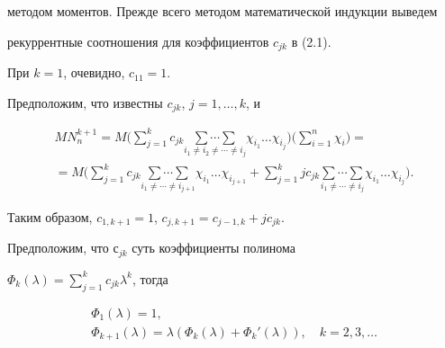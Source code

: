 методом моментов. Прежде всего методом математической индукции выведем


рекуррентные соотношения для коэффициентов $c_{jk}$ в (2.1).





При $k=1$, очевидно, $c_{11}=1$.


Предположим, что известны $c_{jk}$, $j=1,\dotsc ,k$, и


\begin{multline*}


MN_n^{k+1}=M\bigg(\sum_{j=1}^k c_{jk}


\underset{i_1\neq i_2\neq \dotsb \neq i_j}


{\sum\dotsb \sum}{} \chi_{i_1}\dotsc \chi_{i_j}\bigg)


\bigg(\sum_{i=1}^n\chi_i\bigg)= \\


%


=M\bigg(\sum_{j=1}^k c_{jk}


\underset{i_1\neq \dotsb \neq i_{j+1}}


{\sum\dotsb \sum}{}\chi_{i_1}\dotsc \chi_{i_{j+1}}+


\sum_{j=1}^k j c_{jk}


\underset{i_1\neq \dotsb \neq i_j}


{\sum\dotsb \sum}\chi_{i_1}\dotsc \chi_{i_j}\bigg).


\end{multline*}


Таким образом, $c_{1,k+1}=1$, $c_{j,k+1}=c_{j-1,k}+j c_{jk}$.





Предположим, что $с_{jk}$ суть коэффициенты полинома


$\Phi_k(\lambda)=\sum\limits_{j=1}^k c_{jk} \lambda^k$, тогда


\begin{equation}


\begin{array}{c}


\Phi_1(\lambda)=1,\\[2mm]


\Phi_{k+1}(\lambda)=\lambda(\Phi_k(\lambda)+\Phi_k'(\lambda)), 


\quad k =2,3, \dotsc 


\end{array}


\end{equation}


